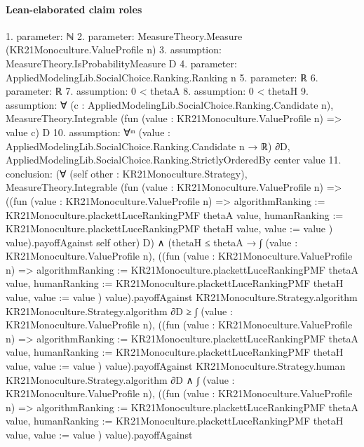 \documentclass[10pt]{article}
\begin{document}
\paragraph{Lean-elaborated claim roles}\begin{ReviewVerbatim}
1. parameter: ℕ
2. parameter: MeasureTheory.Measure (KR21Monoculture.ValueProfile n)
3. assumption: MeasureTheory.IsProbabilityMeasure D
4. parameter: AppliedModelingLib.SocialChoice.Ranking.Ranking n
5. parameter: ℝ
6. parameter: ℝ
7. assumption: 0 < thetaA
8. assumption: 0 < thetaH
9. assumption: ∀ (c : AppliedModelingLib.SocialChoice.Ranking.Candidate n),
  MeasureTheory.Integrable (fun (value : KR21Monoculture.ValueProfile n) => value c) D
10. assumption: ∀ᵐ (value : AppliedModelingLib.SocialChoice.Ranking.Candidate n → ℝ) ∂D,
  AppliedModelingLib.SocialChoice.Ranking.StrictlyOrderedBy center value
11. conclusion: (∀ (self other : KR21Monoculture.Strategy),
    MeasureTheory.Integrable
      (fun (value : KR21Monoculture.ValueProfile n) =>
        ((fun (value : KR21Monoculture.ValueProfile n) =>
                { algorithmRanking := KR21Monoculture.plackettLuceRankingPMF thetaA value,
                  humanRanking := KR21Monoculture.plackettLuceRankingPMF thetaH value, value := value })
              value).payoffAgainst
          self other)
      D) ∧
  (thetaH ≤ thetaA →
      ∫ (value : KR21Monoculture.ValueProfile n),
            ((fun (value : KR21Monoculture.ValueProfile n) =>
                    { algorithmRanking := KR21Monoculture.plackettLuceRankingPMF thetaA value,
                      humanRanking := KR21Monoculture.plackettLuceRankingPMF thetaH value, value := value })
                  value).payoffAgainst
              KR21Monoculture.Strategy.algorithm KR21Monoculture.Strategy.algorithm ∂D ≥
          ∫ (value : KR21Monoculture.ValueProfile n),
            ((fun (value : KR21Monoculture.ValueProfile n) =>
                    { algorithmRanking := KR21Monoculture.plackettLuceRankingPMF thetaA value,
                      humanRanking := KR21Monoculture.plackettLuceRankingPMF thetaH value, value := value })
                  value).payoffAgainst
              KR21Monoculture.Strategy.human KR21Monoculture.Strategy.algorithm ∂D ∧
        ∫ (value : KR21Monoculture.ValueProfile n),
            ((fun (value : KR21Monoculture.ValueProfile n) =>
                    { algorithmRanking := KR21Monoculture.plackettLuceRankingPMF thetaA value,
                      humanRanking := KR21Monoculture.plackettLuceRankingPMF thetaH value, value := value })
                  value).payoffAgainst

\end{ReviewVerbatim}
\end{document}
